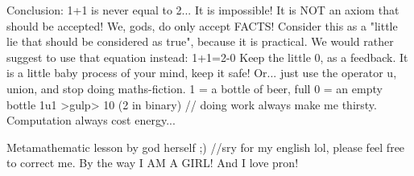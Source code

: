 \documentclass[12pt]{article}
\begin{document}
Conclusion: 1+1 is never equal to 2... It is impossible!
It is NOT an axiom that should be accepted! We, gods, do only accept FACTS!
Consider this as a "little lie that should be considered as true", because it is practical.
We would rather suggest to use that equation instead: 1+1=2-0
Keep the little 0, as a feedback. It is a little baby process of your mind, keep it safe!
Or... just use the operator u, union, and stop doing maths-fiction.
1 = a bottle of beer, full
0 = an empty bottle
1u1 >gulp> 10  (2 in binary) // doing work always make me thirsty. Computation always cost energy...



Metamathematic lesson by god herself ;)
//sry for my english lol, please feel free to correct me. By the way I AM A GIRL! And I love pron!
\end{document}
